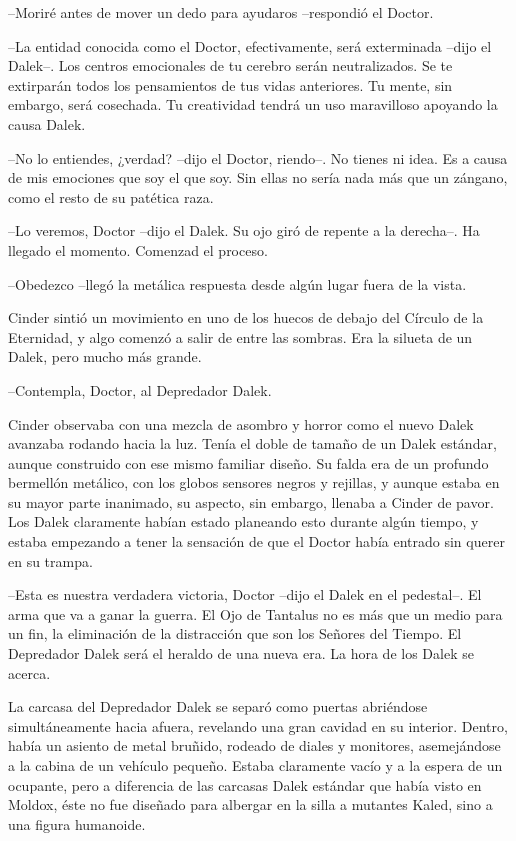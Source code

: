 --Moriré antes de mover un dedo para ayudaros --respondió el Doctor.

--La entidad conocida como el Doctor, efectivamente, será exterminada --dijo el Dalek--. Los centros emocionales de tu cerebro serán neutralizados. Se te extirparán todos los pensamientos de tus vidas anteriores. Tu mente, sin embargo, será cosechada. Tu creatividad tendrá un uso maravilloso apoyando la causa Dalek.

--No lo entiendes, ¿verdad? --dijo el Doctor, riendo--. No tienes ni idea. Es a causa de mis emociones que soy el que soy. Sin ellas no sería nada más que un zángano, como el resto de su patética raza.

--Lo veremos, Doctor --dijo el Dalek. Su ojo giró de repente a la derecha--. Ha llegado el momento. Comenzad el proceso.

--Obedezco --llegó la metálica respuesta desde algún lugar fuera de la vista.



Cinder sintió un movimiento en uno de los huecos de debajo del Círculo de la Eternidad, y algo comenzó a salir de entre las sombras. Era la silueta de un Dalek, pero mucho más grande.



--Contempla, Doctor, al Depredador Dalek.



Cinder observaba con una mezcla de asombro y horror como el nuevo Dalek avanzaba rodando hacia la luz. Tenía el doble de tamaño de un Dalek estándar, aunque construido con ese mismo familiar diseño. Su falda era de un profundo bermellón metálico, con los globos sensores negros y rejillas, y aunque estaba en su mayor parte inanimado, su aspecto, sin embargo, llenaba a Cinder de pavor. Los Dalek claramente habían estado planeando esto durante algún tiempo, y estaba empezando a tener la sensación de que el Doctor había entrado sin querer en su trampa.



--Esta es nuestra verdadera victoria, Doctor --dijo el Dalek en el pedestal--. El arma que va a ganar la guerra. El Ojo de Tantalus no es más que un medio para un fin, la eliminación de la distracción que son los Señores del Tiempo. El Depredador Dalek será el heraldo de una nueva era. La hora de los Dalek se acerca.



La carcasa del Depredador Dalek se separó como puertas abriéndose simultáneamente hacia afuera, revelando una gran cavidad en su interior. Dentro, había un asiento de metal bruñido, rodeado de diales y monitores, asemejándose a la cabina de un vehículo pequeño. Estaba claramente vacío y a la espera de un ocupante, pero a diferencia de las carcasas Dalek estándar que había visto en Moldox, éste no fue diseñado para albergar en la silla a mutantes Kaled, sino a una figura humanoide.

